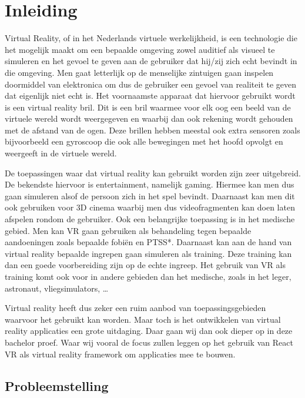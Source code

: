
\chapter{Inleiding}
\label{ch:inleiding}
Virtual Reality, of in het Nederlands virtuele werkelijkheid, is een technologie die het mogelijk maakt om een bepaalde omgeving zowel auditief als visueel te simuleren en het gevoel te geven aan de gebruiker dat hij/zij zich echt bevindt in die omgeving. Men gaat letterlijk op de menselijke zintuigen gaan inspelen doormiddel van elektronica om dus de gebruiker een gevoel van realiteit te geven dat eigenlijk niet echt is. Het voornaamste apparaat dat hiervoor gebruikt wordt is een virtual reality bril. Dit is een bril waarmee voor elk oog een beeld van de virtuele wereld wordt weergegeven en waarbij dan ook rekening wordt gehouden met de afstand van de ogen. Deze brillen hebben meestal ook extra sensoren zoals bijvoorbeeld een gyroscoop die ook alle bewegingen met het hoofd opvolgt en weergeeft in de virtuele wereld.

De toepassingen waar dat virtual reality kan gebruikt worden zijn zeer uitgebreid. De bekendste hiervoor is entertainment, namelijk gaming. Hiermee kan men dus gaan simuleren alsof de persoon zich in het spel bevindt. Daarnaast kan men dit ook gebruiken voor 3D cinema waarbij men dus videofragmenten kan doen laten afspelen rondom de gebruiker. Ook een belangrijke toepassing is in het medische gebied. Men kan VR gaan gebruiken als behandeling tegen bepaalde aandoeningen zoals bepaalde fobiën en PTSS*. Daarnaast kan aan de hand van virtual reality bepaalde ingrepen gaan simuleren als training. Deze training kan dan een goede voorbereiding zijn op de echte ingreep. Het gebruik van VR als training komt ook voor in andere gebieden dan het medische, zoals in het leger, astronaut, vliegsimulators, …

Virtual reality heeft dus zeker een ruim aanbod van toepassingsgebieden waarvoor het gebruikt kan worden. Maar toch is het ontwikkelen van virtual reality applicaties een grote uitdaging. Daar gaan wij dan ook dieper op in deze bachelor proef. Waar wij vooral de focus zullen leggen op het gebruik van React VR als virtual reality framework om applicaties mee te bouwen.

\section{Probleemstelling}
\label{sec:probleemstelling}

